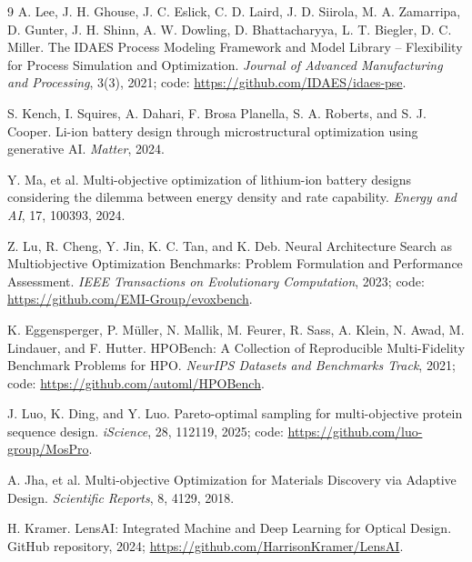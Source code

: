 \documentclass[11pt]{article}
\begin{document}
\begin{thebibliography}{9}
A. Lee, J. H. Ghouse, J. C. Eslick, C. D. Laird, J. D. Siirola, M. A. Zamarripa, D. Gunter, J. H. Shinn, A. W. Dowling, D. Bhattacharyya, L. T. Biegler, D. C. Miller.
\newblock The IDAES Process Modeling Framework and Model Library -- Flexibility for Process Simulation and Optimization.
\newblock \emph{Journal of Advanced Manufacturing and Processing}, 3(3), 2021; code: \url{https://github.com/IDAES/idaes-pse}.

S. Kench, I. Squires, A. Dahari, F. Brosa Planella, S. A. Roberts, and S. J. Cooper.
\newblock Li-ion battery design through microstructural optimization using generative AI.
\newblock \emph{Matter}, 2024.

Y. Ma, et al.
\newblock Multi-objective optimization of lithium-ion battery designs considering the dilemma between energy density and rate capability.
\newblock \emph{Energy and AI}, 17, 100393, 2024.

Z. Lu, R. Cheng, Y. Jin, K. C. Tan, and K. Deb.
\newblock Neural Architecture Search as Multiobjective Optimization Benchmarks: Problem Formulation and Performance Assessment.
\newblock \emph{IEEE Transactions on Evolutionary Computation}, 2023; code: \url{https://github.com/EMI-Group/evoxbench}.

K. Eggensperger, P. M\"uller, N. Mallik, M. Feurer, R. Sass, A. Klein, N. Awad, M. Lindauer, and F. Hutter.
\newblock HPOBench: A Collection of Reproducible Multi-Fidelity Benchmark Problems for HPO.
\newblock \emph{NeurIPS Datasets and Benchmarks Track}, 2021; code: \url{https://github.com/automl/HPOBench}.

J. Luo, K. Ding, and Y. Luo.
\newblock Pareto-optimal sampling for multi-objective protein sequence design.
\newblock \emph{iScience}, 28, 112119, 2025; code: \url{https://github.com/luo-group/MosPro}.

A. Jha, et al.
\newblock Multi-objective Optimization for Materials Discovery via Adaptive Design.
\newblock \emph{Scientific Reports}, 8, 4129, 2018.

H. Kramer.
\newblock LensAI: Integrated Machine and Deep Learning for Optical Design.
\newblock GitHub repository, 2024; \url{https://github.com/HarrisonKramer/LensAI}.


\end{thebibliography}
\end{document}

